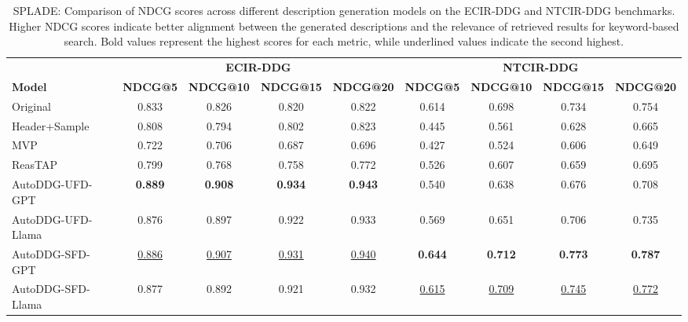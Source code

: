 \begin{table*}[]
    \centering
    \begin{tabular}{l|cccc|cccc}
        \hline
         & \multicolumn{4}{c|}{\bf ECIR-DDG} & \multicolumn{4}{c}{\bf NTCIR-DDG} \\
         \bf Model & \bf NDCG@5 & \bf NDCG@10 & \bf NDCG@15 & \bf NDCG@20 & \bf NDCG@5 & \bf NDCG@10 & \bf NDCG@15 & \bf NDCG@20 \\
        \hline
         Original & 0.833 & 0.826 & 0.820 & 0.822 & 0.614 & 0.698 & 0.734 & 0.754\\
         \hline
         Header+Sample & 0.808 & 0.794 & 0.802 & 0.823 & 0.445 & 0.561 & 0.628 & 0.665\\
         MVP & 0.722 & 0.706 & 0.687 & 0.696 & 0.427 & 0.524 & 0.606 & 0.649\\
         ReasTAP & 0.799 & 0.768 & 0.758 & 0.772 & 0.526 & 0.607 & 0.659 & 0.695\\
         \hline
         AutoDDG-UFD-GPT & \bf 0.889 & \bf 0.908 & \bf 0.934 & \bf 0.943 & 0.540 & 0.638 & 0.676 & 0.708\\
         AutoDDG-UFD-Llama & 0.876 & 0.897 & 0.922 & 0.933 & 0.569 & 0.651 & 0.706 & 0.735\\
         AutoDDG-SFD-GPT & \underline{0.886} & \underline{0.907} & \underline{0.931} & \underline{0.940} & \bf 0.644 & \bf 0.712 & \bf 0.773 & \bf 0.787\\
         AutoDDG-SFD-Llama & 0.877 & 0.892 & 0.921 & 0.932 & \underline{0.615} & \underline{0.709} & \underline{0.745} & \underline{0.772}\\
      \hline
    \end{tabular}
    \caption{SPLADE: Comparison of NDCG scores across different description generation models on the ECIR-DDG and NTCIR-DDG benchmarks. Higher NDCG scores indicate better alignment between the generated descriptions and the relevance of retrieved results for keyword-based search. Bold values represent the highest scores for each metric, while underlined values indicate the second highest. 
    }
    \label{tab:experiment_splade}
\end{table*}